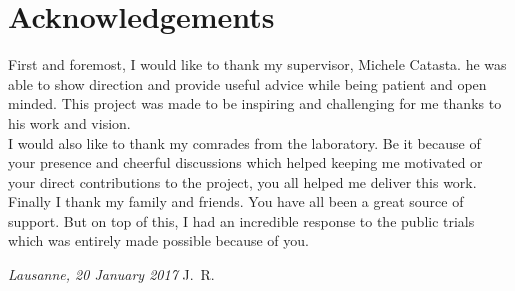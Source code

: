 \chapter*{Acknowledgements}
First and foremost, I would like to thank my supervisor, Michele Catasta. he was able to show direction and provide useful advice while being patient and open minded. This project was made to be inspiring and challenging for me thanks to his work and vision.\\
I would also like to thank my comrades from the laboratory. Be it because of your presence and cheerful discussions which helped keeping me motivated or your direct contributions to the project, you all helped me deliver this work.\\
Finally I thank my family and friends. You have all been a great source of support. But on top of this, I had an incredible response to the public trials which was entirely made possible because of you.

\bigskip
 
\noindent\textit{Lausanne, 20 January 2017}
\hfill J.~R.
